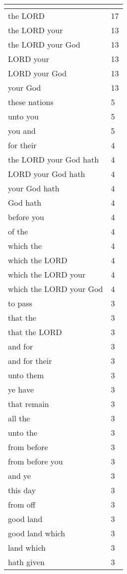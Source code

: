 \begin{center}
\begin{longtable}{|p{3.0in}|p{0.5in}|}
\hline \multicolumn{2}{c}{{ }} \\ \hline
\endfoot 
the LORD & 17\\ \hline 
the LORD your & 13\\ \hline 
the LORD your God & 13\\ \hline 
LORD your & 13\\ \hline 
LORD your God & 13\\ \hline 
your God & 13\\ \hline 
these nations & 5\\ \hline 
unto you & 5\\ \hline 
you and & 5\\ \hline 
for their & 4\\ \hline 
the LORD your God hath & 4\\ \hline 
LORD your God hath & 4\\ \hline 
your God hath & 4\\ \hline 
God hath & 4\\ \hline 
before you & 4\\ \hline 
of the & 4\\ \hline 
which the & 4\\ \hline 
which the LORD & 4\\ \hline 
which the LORD your & 4\\ \hline 
which the LORD your God & 4\\ \hline 
to pass & 3\\ \hline 
that the & 3\\ \hline 
that the LORD & 3\\ \hline 
and for & 3\\ \hline 
and for their & 3\\ \hline 
unto them & 3\\ \hline 
ye have & 3\\ \hline 
that remain & 3\\ \hline 
all the & 3\\ \hline 
unto the & 3\\ \hline 
from before & 3\\ \hline 
from before you & 3\\ \hline 
and ye & 3\\ \hline 
this day & 3\\ \hline 
from off & 3\\ \hline 
good land & 3\\ \hline 
good land which & 3\\ \hline 
land which & 3\\ \hline 
hath given & 3\\ \hline 
\end{longtable}
\end{center}





